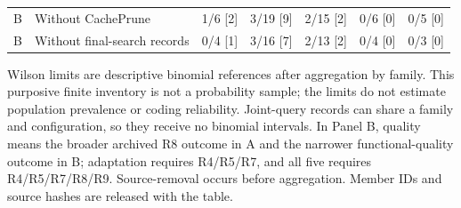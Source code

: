 \begin{table}[t]
\begin{tabularx}{\textwidth}{@{}lYrrrrr@{}}
B & Without CachePrune & 1/6 [2] & 3/19 [9] & 2/15 [2] & 0/6 [0] & 0/5 [0]\\
B & Without final-search records & 0/4 [1] & 3/16 [7] & 2/13 [2] & 0/4 [0] & 0/3 [0]\\
\bottomrule\end{tabularx}
\par\smallskip\raggedright Wilson limits are descriptive binomial references after aggregation by family. This purposive finite inventory is not a probability sample; the limits do not estimate population prevalence or coding reliability. Joint-query records can share a family and configuration, so they receive no binomial intervals. In Panel B, quality means the broader archived R8 outcome in A and the narrower functional-quality outcome in B; adaptation requires R4/R5/R7, and all five requires R4/R5/R7/R8/R9. Source-removal occurs before aggregation. Member IDs and source hashes are released with the table.\end{table}
